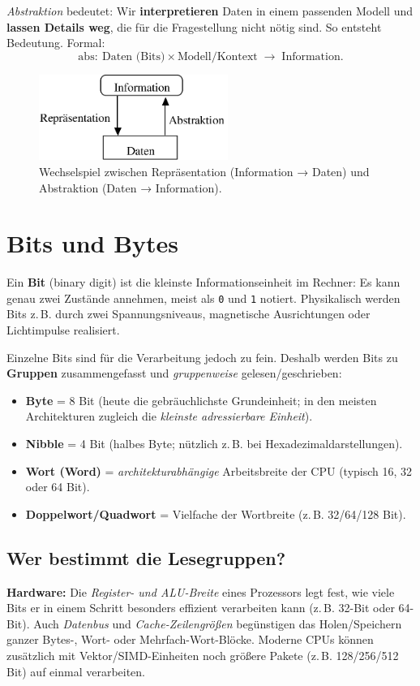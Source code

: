 \documentclass[12pt,a4paper]{book}
\begin{document}
\emph{Abstraktion} bedeutet: Wir \textbf{interpretieren} Daten in einem passenden Modell und \textbf{lassen Details weg}, die für die Fragestellung nicht nötig sind. So entsteht Bedeutung.
Formal:
\[
\mathrm{abs}:\ \text{Daten (Bits)} \times \text{Modell/Kontext} \;\to\; \text{Information}.
\]

\begin{figure}[H]
	\centering
	\includegraphics[width=0.55\textwidth]{info-daten.png}%
	\caption{Wechselspiel zwischen Repräsentation (Information → Daten) und Abstraktion (Daten → Information).}
	\label{fig:info-daten}
\end{figure}

\section{Bits und Bytes}

Ein \textbf{Bit} (binary digit) ist die kleinste Informationseinheit im Rechner: Es kann genau zwei Zustände annehmen, meist als \texttt{0} und \texttt{1} notiert. Physikalisch werden Bits z.\,B. durch zwei Spannungsniveaus, magnetische Ausrichtungen oder Lichtimpulse realisiert.

Einzelne Bits sind für die Verarbeitung jedoch zu fein. Deshalb werden Bits zu \textbf{Gruppen} zusammengefasst und \emph{gruppenweise} gelesen/geschrieben:

\begin{itemize}
	\item \textbf{Byte} = 8 Bit (heute die gebräuchlichste Grundeinheit; in den meisten Architekturen zugleich die \emph{kleinste adressierbare Einheit}).
	\item \textbf{Nibble} = 4 Bit (halbes Byte; nützlich z.\,B. bei Hexadezimaldarstellungen).
	\item \textbf{Wort (Word)} = \emph{architekturabhängige} Arbeitsbreite der CPU (typisch 16, 32 oder 64 Bit).
	\item \textbf{Doppelwort/Quadwort} = Vielfache der Wortbreite (z.\,B. 32/64/128 Bit).
\end{itemize}

\subsection{Wer bestimmt die Lesegruppen?}
\textbf{Hardware:} Die \emph{Register- und ALU-Breite} eines Prozessors legt fest, wie viele Bits er in einem Schritt besonders effizient verarbeiten kann (z.\,B. 32-Bit oder 64-Bit). Auch \emph{Datenbus} und \emph{Cache-Zeilengrößen} begünstigen das Holen/Speichern ganzer Bytes-, Wort- oder Mehrfach-Wort-Blöcke. Moderne CPUs können zusätzlich mit Vektor\-/SIMD-Einheiten noch größere Pakete (z.\,B. 128/256/512 Bit) auf einmal verarbeiten.
\end{document}
